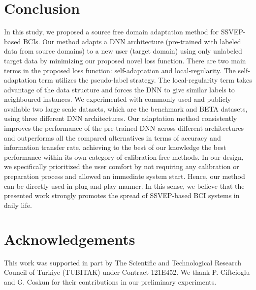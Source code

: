 \documentclass[12pt]{iopart}
\begin{document}
\section{Conclusion} \label{sec:CO}
In this study, we proposed a source free domain adaptation method for SSVEP-based BCIs. Our method adapts a DNN architecture (pre-trained with labeled data from source domains) to a new user (target domain) using only unlabeled target data by minimizing our proposed novel loss function. There are two main terms in the proposed loss function: self-adaptation and local-regularity. The self-adaptation term utilizes the pseudo-label strategy. The local-regularity term takes advantage of the data structure and forces the DNN to give similar labels to neighboured instances. We experimented with commonly used and publicly available two large scale datasets, which are the benchmark and BETA datasets, using three different DNN architectures. Our adaptation method consistently improves the performance of the pre-trained DNN across different architectures and outperforms all the compared alternatives in terms of accuracy and information transfer rate, achieving to the best of our knowledge the best performance within its own category of calibration-free methods. In our design, we specifically prioritized the user comfort by not requiring any calibration or preparation process and allowed an immediate system start. Hence, our method can be directly used in plug-and-play manner. In this sense, we believe that the presented work strongly promotes the spread of SSVEP-based BCI systems in daily life.

\section{Acknowledgements}
This work was supported in part by The Scientific and Technological Research Council of Turkiye (TUBITAK) under Contract 121E452. We thank P. Ciftcioglu and G. Coskun for their contributions in our preliminary experiments.

\newpage
\appendix
\renewcommand{\thetable}{A\arabic{table}}
\setcounter{table}{0}

\renewcommand{\thefigure}{A\arabic{figure}}
\setcounter{figure}{0}
\end{document}
